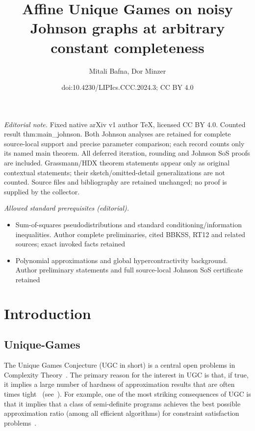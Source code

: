 \documentclass[11pt]{article}
\title{Affine Unique Games on noisy Johnson graphs at arbitrary constant completeness}
\author{Mitali Bafna, Dor Minzer}
\date{doi:10.4230/LIPIcs.CCC.2024.3; CC BY 4.0}
\theoremstyle{definition}
\begin{document}
\maketitle
\noindent\textit{Editorial note.} Fixed native arXiv v1 author TeX, licensed CC BY 4.0. Counted result thm:main\_johnson. Both Johnson analyses are retained for complete source-local support and precise parameter comparison; each record counts only its named main theorem. All deferred iteration, rounding and Johnson SoS proofs are included. Grassmann/HDX theorem statements appear only as original contextual statements; their sketch/omitted-detail generalizations are not counted. Source files and bibliography are retained unchanged; no proof is supplied by the collector.\par\medskip
\noindent\textit{Allowed standard prerequisites (editorial).}\begin{itemize}
\item Sum-of-squares pseudodistributions and standard conditioning/information inequalities. Author complete preliminaries, cited BBKSS, RT12 and related sources; exact invoked facts retained
\item Polynomial approximations and global hypercontractivity background. Author preliminary statements and full source-local Johnson SoS certificate retained
\end{itemize}\medskip
\section{Introduction}
\subsection{Unique-Games}\label{sec:ug}
The Unique Games Conjecture (UGC in short) 
is a central open problems in Complexity Theory~\cite{Khot02}.
The primary reason for the interest in UGC is that, if true, it
implies a large number of hardness of approximation results 
that are often times tight~\cite{KhotR08,KhotKMO07,Austrin,KNSgroth,Raghavendra08}
(see~\cite{KhotICM,trevisan2012khot}). For example, 
one of the most striking
consequences of UGC is that it 
implies that a class of semi-definite programs
achieves the best possible approximation ratio (among all 
efficient algorithms) for constraint satisfaction problems~\cite{Raghavendra08}.
\end{document}

